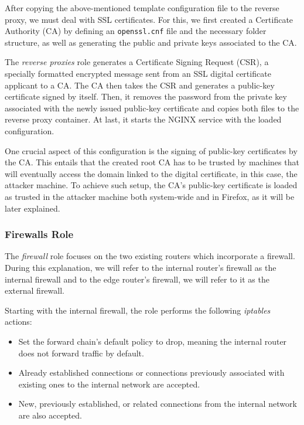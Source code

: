 After copying the above-mentioned template configuration file to the reverse proxy, we must deal with SSL certificates. For this, we first created a Certificate Authority (CA) by defining an \texttt{openssl.cnf} file and the necessary folder structure, as well as generating the public and private keys associated to the CA.

The \textit{reverse proxies} role generates a Certificate Signing Request (CSR), a specially formatted encrypted message sent from an SSL digital certificate applicant to a CA. The CA then takes the CSR and generates a public-key certificate signed by itself. Then, it removes the password from the private key associated with the newly issued public-key certificate and copies both files to the reverse proxy container. At last, it starts the NGINX service with the loaded configuration. 

One crucial aspect of this configuration is the signing of public-key certificates by the CA. This entails that the created root CA has to be trusted by machines that will eventually access the domain linked to the digital certificate, in this case, the attacker machine. To achieve such setup, the CA's public-key certificate is loaded as trusted in the attacker machine both system-wide and in Firefox, as it will be later explained.

\subsubsection{Firewalls Role} \label{sec:ansible_firewalls_role}

The \textit{firewall} role focuses on the two existing routers which incorporate a firewall. During this explanation, we will refer to the internal router's firewall as the internal firewall and to the edge router's firewall, we will refer to it as the external firewall. 

Starting with the internal firewall, the role performs the following \textit{iptables} actions:

\begin{itemize}
    \item Set the forward chain's default policy to drop, meaning the internal router does not forward traffic by default.
    \item Already established connections or connections previously associated with existing ones to the internal network are accepted.
    \item New, previously established, or related connections from the internal network are also accepted.
\end{itemize}

